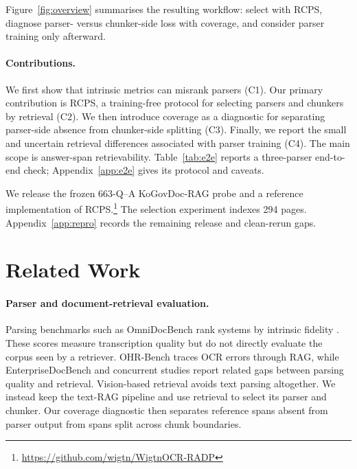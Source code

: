 \documentclass[11pt]{article}
\newcommand{\rcps}{\textnormal{\textsc{RCPS}}}
\newcommand{\contribIntrinsic}{C1}
\newcommand{\contribRCPS}{C2}
\newcommand{\contribCoverage}{C3}
\newcommand{\contribTraining}{C4}
\begin{document}
Figure~\ref{fig:overview} summarises the resulting workflow: select with \rcps{}, diagnose parser- versus chunker-side loss with coverage, and consider parser training only afterward.

\paragraph{Contributions.} We first show that intrinsic metrics can misrank parsers (\contribIntrinsic). Our primary contribution is \rcps{}, a training-free protocol for selecting parsers and chunkers by retrieval (\contribRCPS). We then introduce coverage as a diagnostic for separating parser-side absence from chunker-side splitting (\contribCoverage). Finally, we report the small and uncertain retrieval differences associated with parser training (\contribTraining). The main scope is answer-span retrievability. Table~\ref{tab:e2e} reports a three-parser end-to-end check; Appendix~\ref{app:e2e} gives its protocol and caveats.

We release the frozen 663-Q--A KoGovDoc-RAG probe and a reference implementation of \rcps{}.\footnote{\url{https://github.com/wigtn/WigtnOCR-RADP}} The selection experiment indexes 294 pages. Appendix~\ref{app:repro} records the remaining release and clean-rerun gaps.

\section{Related Work}

\paragraph{Parser and document-retrieval evaluation.} Parsing benchmarks such as OmniDocBench rank systems by intrinsic fidelity \citep{ouyang2025omnidocbench}. These scores measure transcription quality but do not directly evaluate the corpus seen by a retriever. OHR-Bench \citep{zhang2024ohr} traces OCR errors through RAG, while EnterpriseDocBench \citep{enterprisedocbench2026} and concurrent studies \citep{goodocr2026,song2026ocr} report related gaps between parsing quality and retrieval. Vision-based retrieval \citep{faysse2024colpali} avoids text parsing altogether. We instead keep the text-RAG pipeline and use retrieval to select its parser and chunker. Our coverage diagnostic then separates reference spans absent from parser output from spans split across chunk boundaries.
\end{document}
